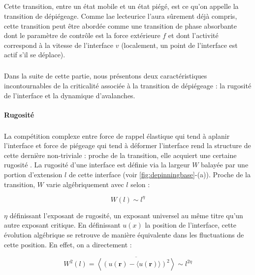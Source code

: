 \subparagraph{}Cette transition, entre un état mobile et un état piégé, est ce qu'on appelle la transition de dépiégeage. Comme lae lecteurice l'aura sûrement déjà compris, cette transition peut être abordée comme une transition de phase absorbante dont le paramètre de contrôle est la force extérieure $f$ et dont l'activité correspond à la vitesse de l'interface $v$ (localement, un point de l'interface est actif s'il se déplace). 


\subparagraph{}Dans la suite de cette partie, nous présentons deux caractéristiques incontournables de la criticalité associée à la transition de dépiégeage : la rugosité de l'interface et la dynamique d'avalanches.

\paragraph{Rugosité}

\subparagraph{}La compétition complexe entre force de rappel élastique qui tend à aplanir l'interface et force de piégeage qui tend à déformer l'interface rend la structure de cette dernière non-triviale : proche de la transition, elle acquiert une certaine rugosité \cite{fisher_collective_1998, wiese_theory_2022}. La rugosité d'une interface est définie via la largeur $W$ balayée par une portion d'extension $l$ de cette interface (voir \autoref{fig:depinningbase}-(a)). Proche de la transition, $W$ varie algébriquement avec $l$ selon :

\begin{equation}
	W(l) \sim l^\eta
\end{equation}

\noindent $\eta$ définissant l'exposant de rugosité, un exposant universel au même titre qu'un autre exposant critique. En définissant $u(x)$ la position de l'interface, cette évolution algébrique se retrouve de manière équivalente dans les fluctuations de cette position. En effet, on a directement :

\begin{equation}
	W^2(l) = \overline{\left\langle (u(\mathbf{r}) - \langle u(\mathbf{r}) \rangle)^2\right\rangle} \sim l^{2\eta}
\end{equation}

